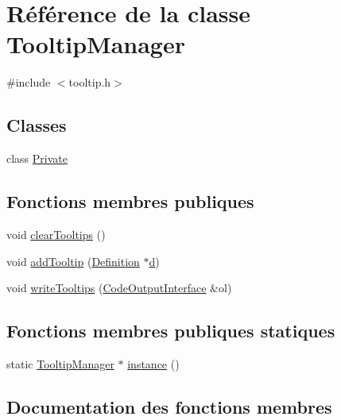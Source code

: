 \hypertarget{class_tooltip_manager}{}\section{Référence de la classe Tooltip\+Manager}
\label{class_tooltip_manager}


{\ttfamily \#include $<$tooltip.\+h$>$}

\subsection*{Classes}
\begin{DoxyCompactItemize}
\item 
class \hyperlink{class_tooltip_manager_1_1_private}{Private}
\end{DoxyCompactItemize}
\subsection*{Fonctions membres publiques}
\begin{DoxyCompactItemize}
\item 
void \hyperlink{class_tooltip_manager_a74bf580759060521d8f930f5669cc3b7}{clear\+Tooltips} ()
\item 
void \hyperlink{class_tooltip_manager_adda422b4a295ce3e723291b4a1154533}{add\+Tooltip} (\hyperlink{class_definition}{Definition} $\ast$\hyperlink{060__command__switch_8tcl_af43f4b1f0064a33b2d662af9f06d3a00}{d})
\item 
void \hyperlink{class_tooltip_manager_a48d73e6c7d74b366a7370df036846a51}{write\+Tooltips} (\hyperlink{class_code_output_interface}{Code\+Output\+Interface} \&ol)
\end{DoxyCompactItemize}
\subsection*{Fonctions membres publiques statiques}
\begin{DoxyCompactItemize}
\item 
static \hyperlink{class_tooltip_manager}{Tooltip\+Manager} $\ast$ \hyperlink{class_tooltip_manager_ab5591eec8d704069b5ef732514e378a1}{instance} ()
\end{DoxyCompactItemize}


\subsection{Documentation des fonctions membres}
\hypertarget{class_tooltip_manager_adda422b4a295ce3e723291b4a1154533}{}
